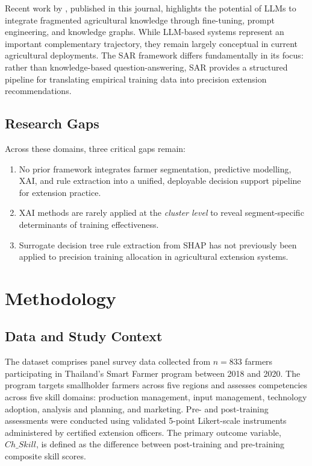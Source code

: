 \documentclass[3p,twocolumn,authoryear]{elsarticle}
\begin{document}
Recent work by \citet{li2025llm}, published in this journal, highlights
the potential of LLMs to integrate fragmented agricultural knowledge
through fine-tuning, prompt engineering, and knowledge graphs.
While LLM-based systems represent an important complementary trajectory,
they remain largely conceptual in current agricultural deployments.
The SAR framework differs fundamentally in its focus: rather than
knowledge-based question-answering, SAR provides a structured pipeline
for translating empirical training data into precision extension
recommendations.

\subsection{Research Gaps}

Across these domains, three critical gaps remain:
\begin{enumerate}
  \item No prior framework integrates farmer segmentation, predictive
    modelling, XAI, and rule extraction into a unified, deployable
    decision support pipeline for extension practice.
  \item XAI methods are rarely applied at the \textit{cluster level}
    to reveal segment-specific determinants of training effectiveness.
  \item Surrogate decision tree rule extraction from SHAP has not
    previously been applied to precision training allocation in
    agricultural extension systems.
\end{enumerate}

\section{Methodology}

\subsection{Data and Study Context}

The dataset comprises panel survey data collected from $n = 833$ farmers
participating in Thailand's Smart Farmer program between 2018 and 2020.
The program targets smallholder farmers across five regions and assesses
competencies across five skill domains: production management, input
management, technology adoption, analysis and planning, and marketing.
Pre- and post-training assessments were conducted using validated
5-point Likert-scale instruments administered by certified extension
officers.
The primary outcome variable, $Ch\_Skill$, is defined as the
difference between post-training and pre-training composite skill scores.
\end{document}
